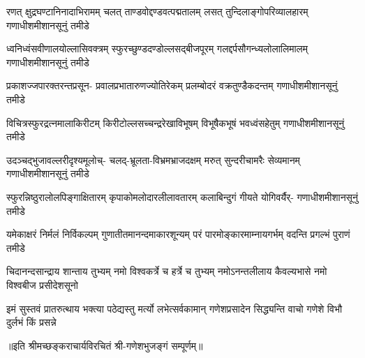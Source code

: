 

\fourlineindentedshloka
{रणत् क्षुद्रघण्टानिनादाभिरामम्}
{चलत् ताण्डवोद्दण्डवत्पद्मतालम्}
{लसत् तुन्दिलाङ्गोपरिव्यालहारम्}
{गणाधीशमीशानसूनुं तमीडे}%

\fourlineindentedshloka
{ध्वनिध्वंसवीणालयोल्लासिवक्त्रम्}
{स्फुरच्छुण्डदण्डोल्लसद्‌बीजपूरम्}
{गलद्दर्पसौगन्ध्यलोलालिमालम्}
{गणाधीशमीशानसूनुं तमीडे}%

\fourlineindentedshloka
{प्रकाशज्जपारक्तरन्तप्रसून-}
{प्रवालप्रभातारुणज्योतिरेकम्}
{प्रलम्बोदरं वक्रतुण्डैकदन्तम्}
{गणाधीशमीशानसूनुं तमीडे}%

\fourlineindentedshloka
{विचित्रस्फुरद्रत्नमालाकिरीटम्}
{किरीटोल्लसच्चन्द्ररेखाविभूषम्}
{विभूषैकभूषं भवध्वंसहेतुम्}
{गणाधीशमीशानसूनुं तमीडे}%

\fourlineindentedshloka
{उदञ्चद्भुजावल्लरीदृश्यमूलोच्-}
{चलद्‌-भ्रूलता-विभ्रमभ्राजदक्षम्}
{मरुत् सुन्दरीचामरैः सेव्यमानम्}
{गणाधीशमीशानसूनुं तमीडे}%

\fourlineindentedshloka
{स्फुरन्निष्ठुरालोलपिङ्गाक्षितारम्}
{कृपाकोमलोदारलीलावतारम्}
{कलाबिन्दुगं गीयते योगिवर्यैर्-}
{गणाधीशमीशानसूनुं तमीडे}%

\fourlineindentedshloka
{यमेकाक्षरं निर्मलं निर्विकल्पम्}
{गुणातीतमानन्दमाकारशून्यम्}
{परं पारमोङ्कारमाम्नायगर्भम्}
{वदन्ति प्रगल्भं पुराणं तमीडे}%

\fourlineindentedshloka
{चिदानन्दसान्द्राय शान्ताय तुभ्यम्}
{नमो विश्वकर्त्रे च हर्त्रे च तुभ्यम्}
{नमोऽनन्तलीलाय कैवल्यभासे}
{नमो विश्वबीज प्रसीदेशसूनो}%

\fourlineindentedshloka
{इमं सुस्तवं प्रातरुत्थाय भक्त्या}
{पठेद्यस्तु मर्त्यो लभेत्सर्वकामान्}
{गणेशप्रसादेन सिद्ध्यन्ति वाचो}
{गणेशे विभौ दुर्लभं किं प्रसन्ने}%

॥इति श्रीमच्छङ्कराचार्यविरचितं श्री-गणेशभुजङ्गं सम्पूर्णम्॥
